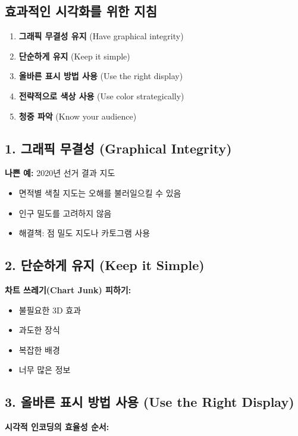 \documentclass[12pt,a4paper]{article}
\begin{document}
\subsection{효과적인 시각화를 위한 지침}

\begin{enumerate}
    \item \textbf{그래픽 무결성 유지} (Have graphical integrity)
    \item \textbf{단순하게 유지} (Keep it simple)
    \item \textbf{올바른 표시 방법 사용} (Use the right display)
    \item \textbf{전략적으로 색상 사용} (Use color strategically)
    \item \textbf{청중 파악} (Know your audience)
\end{enumerate}

\subsection{1. 그래픽 무결성 (Graphical Integrity)}

\textbf{나쁜 예:} 2020년 선거 결과 지도
\begin{itemize}
    \item 면적별 색칠 지도는 오해를 불러일으킬 수 있음
    \item 인구 밀도를 고려하지 않음
    \item 해결책: 점 밀도 지도나 카토그램 사용
\end{itemize}

\subsection{2. 단순하게 유지 (Keep it Simple)}

\textbf{차트 쓰레기(Chart Junk) 피하기:}
\begin{itemize}
    \item 불필요한 3D 효과
    \item 과도한 장식
    \item 복잡한 배경
    \item 너무 많은 정보
\end{itemize}

\subsection{3. 올바른 표시 방법 사용 (Use the Right Display)}

\textbf{시각적 인코딩의 효율성 순서:}
\end{document}
